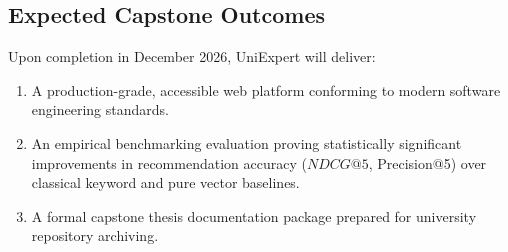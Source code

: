 \documentclass[11pt,a4paper]{article}
\begin{document}
\subsection{Expected Capstone Outcomes}
Upon completion in December 2026, UniExpert will deliver:
\begin{enumerate}[noitemsep]
    \item A production-grade, accessible web platform conforming to modern software engineering standards.
    \item An empirical benchmarking evaluation proving statistically significant improvements in recommendation accuracy ($NDCG@5$, Precision@5) over classical keyword and pure vector baselines.
    \item A formal capstone thesis documentation package prepared for university repository archiving.
\end{enumerate}
\end{document}
